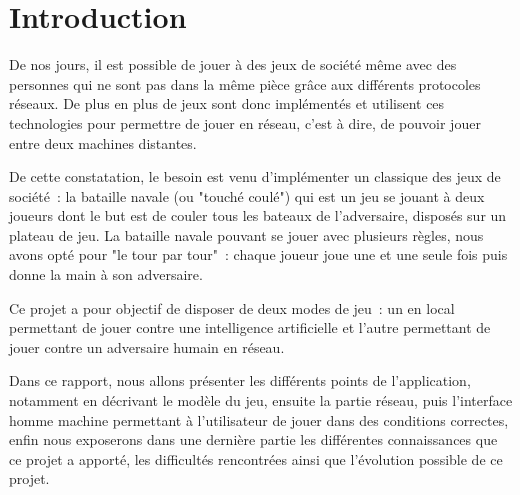 \section*{Introduction} %
	De nos jours, il est possible de jouer à des jeux de société même avec des personnes qui ne sont pas dans la même pièce grâce aux différents protocoles réseaux. De plus en plus de jeux sont donc implémentés et utilisent ces technologies pour permettre de jouer en réseau, c'est à dire, de pouvoir jouer entre deux machines distantes. \newline

	De cette constatation, le besoin est venu d'implémenter un classique des jeux de société~: la bataille navale (ou "touché coulé") qui est un jeu se jouant à deux joueurs dont le but est de couler tous les bateaux de l'adversaire, disposés sur un plateau de jeu. La bataille navale pouvant se jouer avec plusieurs règles, nous avons opté pour "le tour par tour"~: chaque joueur joue une et une seule fois puis donne la main à son adversaire. \newline
	
	Ce projet a pour objectif de disposer de deux modes de jeu~: un en local permettant de jouer contre une intelligence artificielle et l'autre permettant de jouer contre un adversaire humain en réseau.\newline
	
	Dans ce rapport, nous allons présenter les différents points de l'application, notamment en décrivant le modèle du jeu, ensuite la partie réseau, puis l'interface homme machine permettant à l'utilisateur de jouer dans des conditions correctes, enfin nous exposerons dans une dernière partie les différentes connaissances que ce projet a apporté, les difficultés rencontrées ainsi que l'évolution possible de ce projet.

